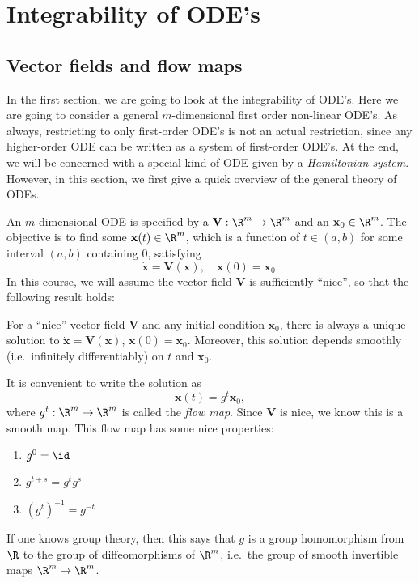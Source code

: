 \documentclass[a4paper]{article}
\begin{document}
\section{Integrability of ODE's}
\subsection{Vector fields and flow maps}
In the first section, we are going to look at the integrability of ODE's. Here we are going to consider a general $m$-dimensional first order non-linear ODE's. As always, restricting to only first-order ODE's is not an actual restriction, since any higher-order ODE can be written as a system of first-order ODE's. At the end, we will be concerned with a special kind of ODE given by a \emph{Hamiltonian system}. However, in this section, we first give a quick overview of the general theory of ODEs.

An $m$-dimensional ODE is specified by a  $\mathbf{V}: \R^m \to \R^m$ and an  $\mathbf{x}_0 \in \R^m$. The objective is to find some $\mathbf{x}(t) \in \R^m$, which is a function of $t \in (a, b)$ for some interval $(a, b)$ containing $0$, satisfying
\[
  \dot{\mathbf{x}} = \mathbf{V}(\mathbf{x}),\quad \mathbf{x}(0) = \mathbf{x}_0.
\]
In this course, we will assume the vector field $\mathbf{V}$ is sufficiently ``nice'', so that the following result holds:
\begin{fact}
  For a ``nice'' vector field $\mathbf{V}$ and any initial condition $\mathbf{x}_0$, there is always a unique solution to $\dot{\mathbf{x}} = \mathbf{V}(\mathbf{x})$, $\mathbf{x}(0) = \mathbf{x}_0$. Moreover, this solution depends smoothly (i.e.\ infinitely differentiably) on $t$ and $\mathbf{x}_0$.
\end{fact}

It is convenient to write the solution as
\[
  \mathbf{x}(t) = g^t \mathbf{x}_0,
\]
where $g^t: \R^m \to \R^m$ is called the \emph{flow map}. Since $\mathbf{V}$ is nice, we know this is a smooth map. This flow map has some nice properties:
\begin{prop}\leavevmode
  \begin{enumerate}
    \item $g^0 = \id$
    \item $g^{t + s} = g^t g^s$
    \item $(g^{t})^{-1} = g^{-t}$
  \end{enumerate}
\end{prop}
If one knows group theory, then this says that $g$ is a group homomorphism from $\R$ to the group of diffeomorphisms of $\R^m$, i.e.\ the group of smooth invertible maps $\R^m \to \R^m$.
\end{document}
